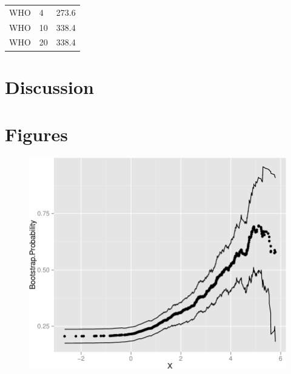 \documentclass[11pt,]{article}
\begin{document}
\begin{longtable}[c]{@{}lll@{}}
\begin{minipage}[t]{0.13\columnwidth}\raggedright\strut
WHO
\strut\end{minipage} &
\begin{minipage}[t]{0.18\columnwidth}\raggedright\strut
4
\strut\end{minipage} &
\begin{minipage}[t]{0.18\columnwidth}\raggedright\strut
273.6
\strut\end{minipage}\tabularnewline
\begin{minipage}[t]{0.13\columnwidth}\raggedright\strut
WHO
\strut\end{minipage} &
\begin{minipage}[t]{0.18\columnwidth}\raggedright\strut
10
\strut\end{minipage} &
\begin{minipage}[t]{0.18\columnwidth}\raggedright\strut
338.4
\strut\end{minipage}\tabularnewline
\begin{minipage}[t]{0.13\columnwidth}\raggedright\strut
WHO
\strut\end{minipage} &
\begin{minipage}[t]{0.18\columnwidth}\raggedright\strut
20
\strut\end{minipage} &
\begin{minipage}[t]{0.18\columnwidth}\raggedright\strut
338.4
\strut\end{minipage}\tabularnewline
\bottomrule
\end{longtable}

\section{Discussion}\label{discussion}

\section{Figures}\label{figures}

\begin{figure}[htbp]
\centering
\includegraphics{manuscript_files/figure-latex/epa_child_cp_plot-1.pdf}
\caption{}
\end{figure}
\end{document}
